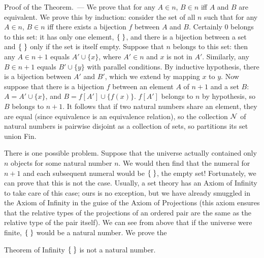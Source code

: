 {\sc Proof of the Theorem.~---} We prove that for any $A \in n$, $B \in n$ iff
$A$ and $B$ are equivalent.
We prove this by induction: consider the set of
all $n$ such that for any $A \in n$, $B \in n$ iff there exists a
bijection $f$ between $A$ and $B$.
Certainly 0 belongs to this set: it has only one element, $\mbox{$\{\;\}$}$, and
there is a bijection between a set and $\mbox{$\{\;\}$}$ only if the set is itself
empty.  Suppose that $n$ belongs to this set: then any $A \in
n+1$ equals $ A' \cup \{x\}$, where $A' \in n$ and $x$ is not in $A'$.
Similarly, any $B \in n+1$ equals $B' \cup \{y\}$ with parallel conditions.  By
inductive hypothesis, there is a bijection between $A'$ and $B'$, which we
extend by mapping $x$ to $y$.  Now suppose that there is a bijection $f$
between an element $A$ of $n+1$ and a set $B$: $A = A' \cup \{x\}$, and $B =
f[A'] \cup \{f(x)\}$. $f[A']$ belongs to $n$ by hypothesis, so $B$ belongs to
$n+1$.  It follows that if two natural numbers share an
element, they are equal (since equivalence is an equivalence
relation), so the collection
${\cal N}$ of natural numbers is pairwise disjoint as a
collection of sets, so partitions its set union Fin.
\finpreuve

There is one possible problem.  Suppose that the universe actually contained only $n$ objects for some natural number $n$.
We would then find that the numeral for $n+1$ and each subsequent numeral
would be $\mbox{$\{\;\}$}$, the empty set!  Fortunately, we can prove
that this is not the case.  Usually, a set theory has an Axiom of
Infinity to take care of this case; ours is no exception, but
we have already smuggled in the Axiom of Infinity in the guise
of the Axiom of Projections (this axiom ensures that the
relative types of the projections of an ordered
pair are the same as the relative type of the pair itself).
We can see from above that if the universe were finite,
$\mbox{$\{\;\}$}$ would be a natural number.  We prove the

\begin{Thm}{Theorem of Infinity}
 $\mbox{$\{\;\}$}$ is not a natural number.
\end{Thm}

